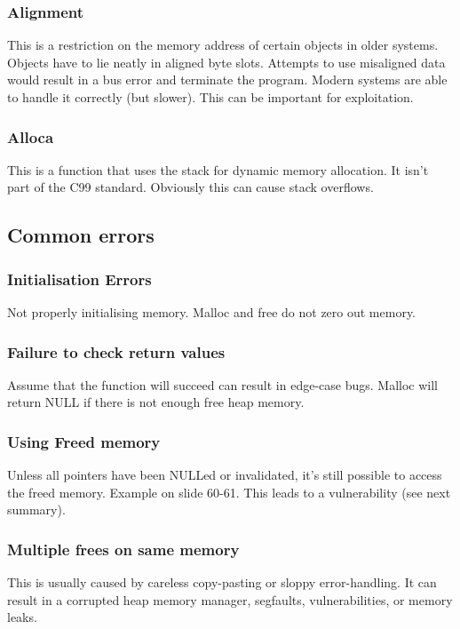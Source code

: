 \documentclass[letterpaper]{article}
\begin{document}
\subsubsection{Alignment}
This is a restriction on the memory address of certain objects in older systems. Objects have to lie neatly in aligned byte slots. Attempts to use misaligned data would result in a bus error and terminate the program. Modern systems are able to handle it correctly (but slower). This can be important for exploitation.

\subsubsection{Alloca}
This is a function that uses the stack for dynamic memory  allocation. It isn't part of the C99 standard. Obviously this can cause stack overflows.

\subsection{Common errors}
\subsubsection{Initialisation Errors}
Not properly initialising memory. Malloc and free do not zero out memory.

\subsubsection{Failure to check return values}
Assume that the function will succeed can result in edge-case bugs. Malloc will return NULL if there is not enough free heap memory.

\subsubsection{Using Freed memory}
Unless all pointers have been NULLed or invalidated, it's still possible to access the freed memory. Example on slide 60-61. This leads to a vulnerability (see next summary).

\subsubsection{Multiple frees on same memory}
This is usually caused by careless copy-pasting or sloppy error-handling. It can result in a corrupted heap memory manager, segfaults, vulnerabilities, or memory leaks.
\end{document}
